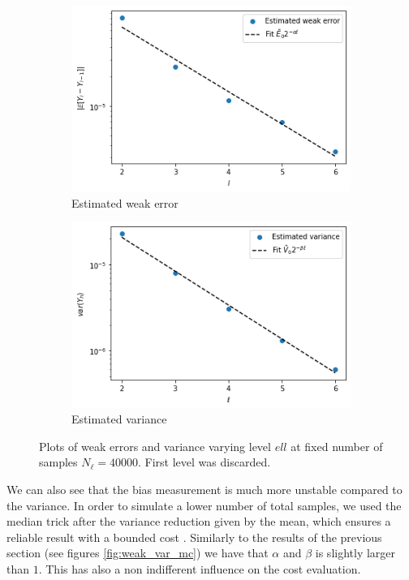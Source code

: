 \begin{figure}[t]
\begin{subfigure}{0.5\textwidth}
\includegraphics[width=\textwidth]{graphics/d/weak.png}
\caption{Estimated weak error}
\end{subfigure}
\begin{subfigure}{0.5\textwidth}
\includegraphics[width=\textwidth]{graphics/d/variances.png}
\caption{Estimated variance}
\end{subfigure}
\caption{Plots of weak errors and variance varying level $ell$ at fixed number of samples $N_\ell = 40000$. First level was discarded.}
\label{fig:weak_var_mlmc}
\end{figure}

We can also see that the bias measurement is much more unstable compared to the variance. In order to simulate a lower number of total samples, we used the median trick after the variance reduction given by the mean, which ensures a reliable result with a bounded cost \cite{mom}.
Similarly to the results of the previous section (see figures \ref{fig:weak_var_mc}) we have that $\alpha$ and $\beta$ is slightly larger than $1$. 
This has also a non indifferent influence on the cost evaluation. 

